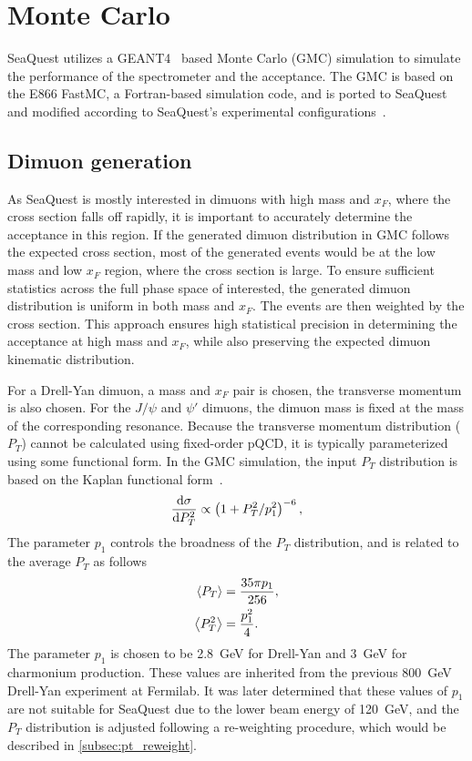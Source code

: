 \documentclass[../main.tex]{subfiles}
\begin{document}
\section{Monte Carlo}
\label{sec:MC}
SeaQuest utilizes a GEANT4~\cite{agostinelli2003,allison2006,allison2016}
based Monte Carlo (GMC) simulation to simulate the
performance of the spectrometer and the acceptance. The GMC is based on the
E866 FastMC, a Fortran-based simulation code, and is ported to SeaQuest and
modified according to SeaQuest's experimental configurations~\cite{kerns2018,prasad2020}.

\subsection{Dimuon generation}
As SeaQuest is mostly interested in dimuons with high mass and $x_F$, where the cross section
falls off rapidly, it is important to accurately determine the acceptance in this region.
If the generated dimuon distribution in GMC follows the expected cross section, most of the
generated events would be at the low mass and low $x_F$ region, where the cross section is large.
To ensure sufficient statistics across the full phase space of interested, the generated dimuon
distribution is uniform in both mass and $x_F$. The events are then weighted by the cross
section. This approach ensures high statistical precision in determining the acceptance
at high mass and $x_F$, while also preserving the expected dimuon kinematic distribution.

For a Drell-Yan dimuon, a mass and $x_F$ pair is chosen, the transverse momentum is also chosen.
For the $J/\psi$ and $\psi'$ dimuons, the dimuon mass is fixed at the mass of the corresponding
resonance.
Because the transverse momentum distribution ($P_T$) cannot be calculated using
fixed-order pQCD, it is typically parameterized using some functional form.
In the GMC simulation, the input $P_T$ distribution is based on the
Kaplan functional form~\cite{kaplan1978}.
\begin{equation}
	\dv{\sigma}{P_T^2} \propto \left(1+ P_T^2/p_1^2\right)^{-6},
	\label{eq:kaplan}
\end{equation}
The parameter $p_1$ controls the broadness of the $P_T$ distribution, and is
related to the average $P_T$ as follows
\begin{equation}
	\begin{split}
		\expval{P_T}   & = \frac{35\pi p_1}{256}, \\
		\expval{P_T^2} & = \frac{p_1^2}{4}.
		\label{eq:kaplan_mean}
	\end{split}
\end{equation}
The parameter $p_1$ is chosen to be \SI{2.8}{\GeV} for Drell-Yan and \SI{3}{\GeV} for charmonium
production. These values are inherited from the previous \SI{800}{\GeV} Drell-Yan experiment at Fermilab.
It was later determined that these values of $p_1$ are not suitable for SeaQuest due to the lower
beam energy of \SI{120}{\GeV}, and the $P_T$ distribution is adjusted following a re-weighting procedure, which
would be described in \cref{subsec:pt_reweight}.
\end{document}

